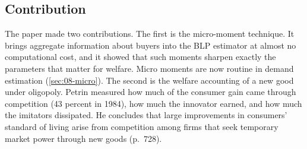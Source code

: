\subsection{Contribution}\label{sec:10-petrin-contribution}

The paper made two contributions. The first is the micro-moment technique. It brings aggregate information
about buyers into the BLP estimator at almost no computational cost, and it showed that such moments sharpen exactly
the parameters that matter for welfare. Micro moments are now routine in demand estimation (\cref{sec:08-micro}). The
second is the welfare accounting of a new good under oligopoly. Petrin measured how much of the consumer gain came
through competition (43 percent in 1984), how much the innovator earned, and how much the imitators dissipated. He
concludes that large improvements in consumers' standard of living arise from competition among firms that seek
temporary market power through new goods (p.~728).

